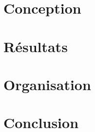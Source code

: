 \documentclass[12pt]{article}
\begin{document}
\pagebreak








\section{Conception}
\newpage 

\section{Résultats}
\newpage 
\section{Organisation}
\newpage 
\section{Conclusion}

\newpage
%
%
\end{document}
